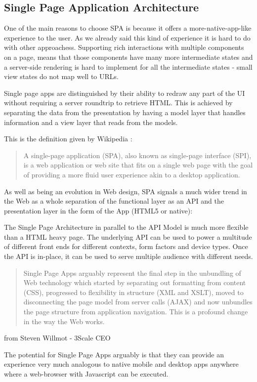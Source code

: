 \documentclass[a4paper,13pt]{report}
\begin{document}
\subsection{Single Page Application Architecture}
 One of the main reasons to choose SPA is because it offers a more-native-app-like experience to the user. As we already said this kind of experience it is hard to do with other approachess.
 Supporting rich interactions with multiple components on a page, means that those components have many more intermediate states and a server-side rendering is hard to implement for all the intermediate states - small view states do not map well to URLs.

Single page apps are distinguished by their ability to redraw any part of the UI without requiring a server roundtrip to retrieve HTML. This is achieved by separating the data from the presentation by having a model layer that handles information and a view layer that reads from the models.


This is the definition given by Wikipedia \cite{SPAWikipedia}:
\begin{quotation}
A single-page application (SPA), also known as single-page interface (SPI), is a web application or web site that fits on a single web page with the goal of providing a more fluid user experience akin to a desktop application.
\end{quotation}


As well as being an evolution in Web design, SPA signals a much wider trend in the Web as a whole  separation of the functional layer as an API and the presentation layer in the form of the App (HTML5 or native):

The Single Page Architecture in parallel to the API Model is much more flexible than a HTML heavy page. The underlying API can be used to power a multitude of different front ends for different contexts, form factors and device types. Once the API is in-place, it can be used to serve multiple audience with different needs. \newline
\begin{quotation}
Single Page Apps arguably represent the final step in the unbundling of Web technology which started by separating out formatting from content (CSS), progressed to flexibility in structure (XML and XSLT), moved to disconnecting the page model from server calls (AJAX) and now unbundles the page structure from application navigation. This is a profound change in the way the Web works.
\end{quotation}
\begin{flushright}
from Steven Willmot - 3Scale CEO\cite{appification}
\end{flushright}
The potential for Single Page Apps arguably is that they can provide an experience very much analogous to native mobile and desktop apps anywhere where a web-browser with Javascript can be executed.
\end{document}
